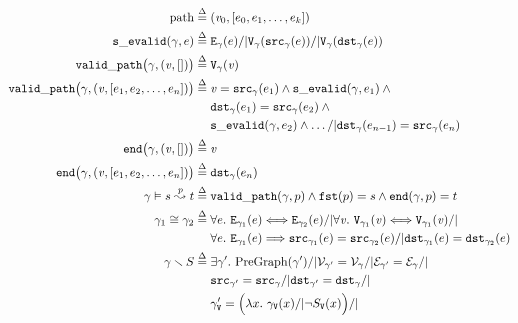\begin{figure}
	\begin{gather*}
     	\begin{aligned}
    	\mathrm{path} \; \defeq \; &(\m{v}_0, [e_0, e_1, \dots, e_k]) \\ 
    	\mathtt{s\_evalid}(\gamma, e) \; \defeq \; & \mathtt{E}_{\gamma}(e) /| 
    	\mathtt{V}_{\gamma}(\mathtt{src}_{\gamma}(e)) /| 
    	\mathtt{V}_{\gamma}(\mathtt{dst}_{\gamma}(e)) \\
		\mathtt{valid\_path}\big(\gamma, (\m{v},[])\big) \;\defeq \; & \mathtt{V}_{\gamma}(\m{v})\\
		\mathtt{valid\_path}\big(\gamma, (\m{v},[e_1,e_2,\dots,e_n])\big) \; \defeq \; &\m{v}=\mathtt{src}_{\gamma}(e_1) \wedge \mathtt{s\_evalid}(\gamma,e_1) \wedge \null \\
    &\mathtt{dst}_{\gamma}(e_1)=\mathtt{src}_{\gamma}(e_2) \wedge \null\\
    &\mathtt{s\_evalid}(\gamma, e_2) \wedge \dots /| \mathtt{dst}_{\gamma}(e_{n-1})=\mathtt{src}_{\gamma}(e_n) \\ 
        \mathtt{end}\big(\gamma, (\m{v}, [])\big)\;\defeq\;& \m{v}\\
      	\mathtt{end}\big(\gamma, (\m{v},[e_1,e_2,\dots,e_n])\big)\;\defeq\;&
      	\mathtt{dst}_{\gamma}(e_{n})\\
      	\gamma \vDash s \overset{\m{p}}{\leadsto} t \;\defeq\; &
        \mathtt{valid\_path}(\gamma, p)\wedge
        \mathtt{fst}(p)=s \wedge \mathtt{end}(\gamma,p)=t \\
        \gamma_1 \cong \gamma_2 \; \defeq \; & 
        	\forall e.~\mathtt{E}_{\gamma_1}(e) <=> \mathtt{E}_{\gamma_2}(e) /| \forall \m{v}.~\mathtt{V}_{\gamma_1}(\m{v}) <=> \mathtt{V}_{\gamma_1}(\m{v}) /| \null \\
        	&\forall e.~\mathtt{E}_{\gamma_1}(e) ==> \mathtt{src}_{\gamma_1}(e) = \mathtt{src}_{\gamma_2}(e) /| \mathtt{dst}_{\gamma_1}(e) = \mathtt{dst}_{\gamma_2}(e) \\
       	\gamma \smallsetminus S \; \defeq \; & \exists \gamma'.~\mathrm{PreGraph}(\gamma') /| 
       	 	{\mathcal{V}}_{\gamma'} = {\mathcal{V}}_{\gamma} /| 
          {\mathcal{E}}_{\gamma'} = {\mathcal{E}}_{\gamma} /| \null \\
          &{\mathtt{src}}_{\gamma'} = {\mathtt{src}}_{\gamma} /|
          {\mathtt{dst}}_{\gamma'} = {\mathtt{dst}}_{\gamma} /| \null \\
       	 	&\gamma'_{\mathtt{V}} = \Big(\lambda x.~ \gamma_{\mathtt{V}}(x) /| \lnot S_{\mathtt{V}}(x)\Big) /| \null \\ 

\end{aligned}
\end{gather*}
\end{figure}
